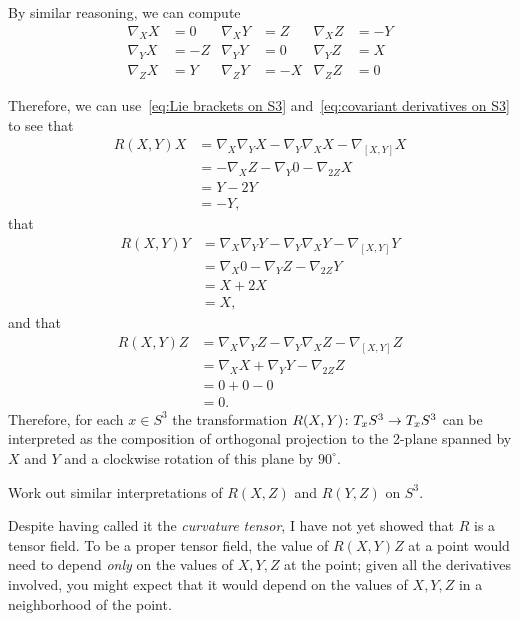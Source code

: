 \begin{example}
	By similar reasoning, we can compute
	\begin{align}\label{eq:covariant derivatives on S3}
		\nabla_XX & = 0 & \nabla_XY & = Z  & \nabla_XZ & = -Y \nonumber\\
		\nabla_YX & = -Z & \nabla_YY & = 0 &  \nabla_YZ & = X \\
		\nabla_ZX & = Y & \nabla_ZY & = -X & \nabla_ZZ & = 0 \nonumber
	\end{align}
	
	Therefore, we can use~\eqref{eq:Lie brackets on S3} and~\eqref{eq:covariant derivatives on S3} to see that
	\begin{align*}
		R(X,Y)X & = \nabla_X\nabla_YX - \nabla_Y\nabla_XX - \nabla_{[X,Y]}X \\
		& = -\nabla_XZ - \nabla_Y 0 -\nabla_{2Z}X \\
		& = Y-2Y \\
		& = -Y,
	\end{align*}
	that
	\begin{align} \label{eq:RXYY on S3}
		R(X,Y)Y & = \nabla_X\nabla_YY - \nabla_Y\nabla_XY - \nabla_{[X,Y]}Y \nonumber \\
		& = \nabla_X0 - \nabla_Y Z -\nabla_{2Z}Y \\
		& = X+2X \nonumber\\
		& = X, \nonumber
	\end{align}
	and that
	\begin{align*}
		R(X,Y)Z & = \nabla_X\nabla_YZ - \nabla_Y\nabla_XZ - \nabla_{[X,Y]}Z \\
		& = \nabla_XX + \nabla_Y Y -\nabla_{2Z}Z \\
		& = 0+0-0 \\
		& = 0.
	\end{align*}
	Therefore, for each $x \in S^3$ the transformation $R(X,Y) \colon\thinspace\! T_x S^3 \to T_xS^3$ can be interpreted as the composition of orthogonal projection to the 2-plane spanned by $X$ and $Y$ and a clockwise rotation of this plane by $90^\circ$.
\end{example}

\begin{exercise}\label{ex:curvature transformation on S^3}
	Work out similar interpretations of $R(X,Z)$ and $R(Y,Z)$ on $S^3$.
\end{exercise}

Despite having called it the \emph{curvature tensor}, I have not yet showed that $R$ is a tensor field. To be a proper tensor field, the value of $R(X,Y)Z$ at a point would need to depend \emph{only} on the values of $X,Y,Z$ at the point; given all the derivatives involved, you might expect that it would depend on the values of $X,Y,Z$ in a neighborhood of the point. 

